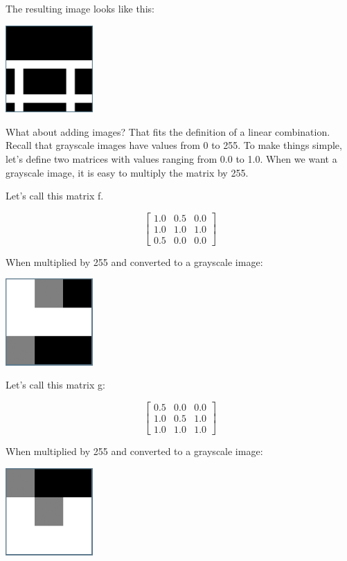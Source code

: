 The resulting image looks like this:

\includegraphics[width=0.25\textwidth]{transpose.png}

What about adding images? That fits the definition of a linear combination. 
Recall that grayscale images have values from 0 to 255. To make things simple, 
let's define two matrices with values ranging from 0.0 to 1.0. When we want a 
grayscale image, it is easy to multiply the matrix by 255. 

Let's call this matrix f.

$$\begin{bmatrix}
1.0 & 0.5 & 0.0\\
1.0 & 1.0 & 1.0\\
0.5 & 0.0 & 0.0 
\end{bmatrix}$$

When multiplied by 255 and converted to a grayscale image:

\includegraphics[width=0.25\textwidth]{fBitmap.png}

Let's call this matrix g:

$$\begin{bmatrix}
0.5 & 0.0 & 0.0\\
1.0 & 0.5 & 1.0\\
1.0 & 1.0 & 1.0 
\end{bmatrix}$$

When multiplied by 255 and converted to a grayscale image:

\includegraphics[width=0.25\textwidth]{gBitmap.png}

